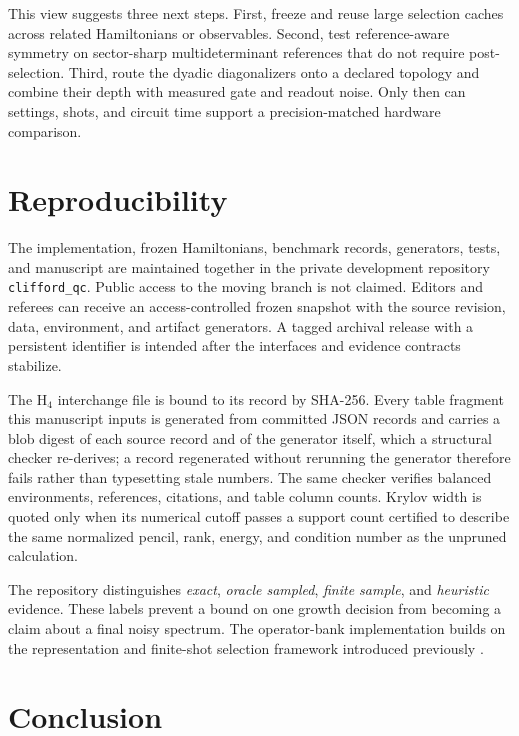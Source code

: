 \documentclass[aps,pra,reprint,superscriptaddress,nofootinbib,floatfix]{revtex4-2}
\begin{document}
This view suggests three next steps.  First, freeze and reuse large selection
caches across related Hamiltonians or observables.  Second, test
reference-aware symmetry on sector-sharp multideterminant references that do
not require post-selection.  Third, route the dyadic diagonalizers onto a
declared topology and combine their depth with measured gate and readout noise.
Only then can settings, shots, and circuit time support a precision-matched
hardware comparison.

\section{Reproducibility}
\label{sec:reproducibility}

The implementation, frozen Hamiltonians, benchmark records, generators, tests,
and manuscript are maintained together in the private development repository
\texttt{clifford\_qc}.  Public access to the moving branch is not claimed.
Editors and referees can receive an access-controlled frozen snapshot with the
source revision, data, environment, and artifact generators.  A tagged
archival release with a persistent identifier is intended after the interfaces
and evidence contracts stabilize.

The H$_4$ interchange file is bound to its record by SHA-256.  Every table
fragment this manuscript inputs is generated from committed JSON records and
carries a blob digest of each source record and of the generator itself, which
a structural checker re-derives; a record regenerated without rerunning the
generator therefore fails rather than typesetting stale numbers.  The same
checker verifies balanced environments, references, citations, and table
column counts.  Krylov width is quoted only when its numerical cutoff passes a
support count certified to describe the same normalized pencil, rank, energy,
and condition number as the unpruned calculation.

The repository distinguishes \emph{exact}, \emph{oracle sampled},
\emph{finite sample}, and \emph{heuristic} evidence.  These labels prevent a
bound on one growth decision from becoming a claim about a final noisy
spectrum.  The operator-bank implementation builds on the representation and
finite-shot selection framework introduced previously
\cite{utama2026operatorcentric}.

\section{Conclusion}
\label{sec:conclusion}
\end{document}

